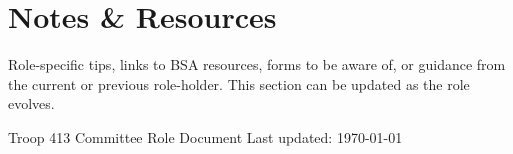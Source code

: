 \documentclass[11pt, letterpaper]{article}
\begin{document}
\vspace{0.8em}

\section{Notes \& Resources}
Role-specific tips, links to BSA resources, forms to be aware of, or guidance from the current or previous role-holder. This section can be updated as the role evolves.

\vfill
\begin{center}
  \footnotesize\color{gray}
  Troop 413 \textbullet{} Committee Role Document \textbullet{} Last updated: \today
\end{center}
\end{document}
